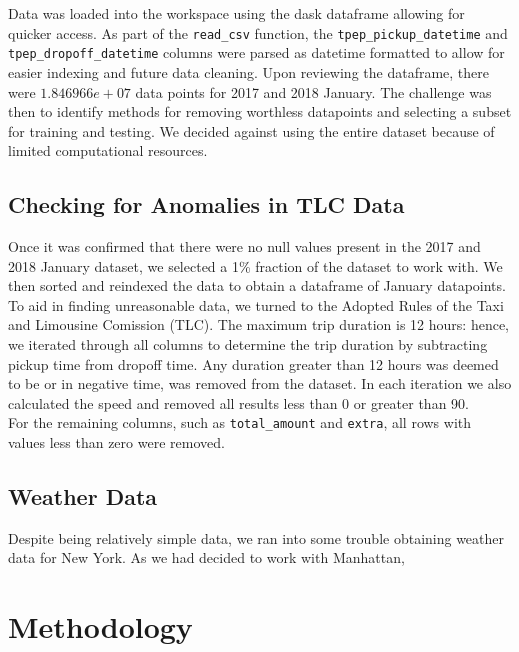 \documentclass[journal]{IEEEtran}
\newcommand{\cc}[1]{\texttt{#1}}
\begin{document}
\noindent Data was loaded into the workspace using the dask dataframe allowing for quicker access. As part of the \cc{read\_csv} function, the  \cc{tpep\_pickup\_datetime} and \cc{tpep\_dropoff\_datetime} columns were parsed as datetime formatted to allow for easier indexing and future data cleaning. Upon reviewing the dataframe, there were $1.846966e+07$ data points for 2017 and 2018 January. The challenge was then to identify methods for removing worthless datapoints and selecting a subset for training and testing. We decided against using the entire dataset because of limited computational resources. 

\subsection{Checking for Anomalies in TLC Data}

\noindent Once it was confirmed that there were no null values present in the 2017 and 2018 January dataset, we selected a {\color{red} 1\% fraction} of the dataset to work with. We then sorted and reindexed the data to obtain a dataframe of January datapoints.\\

\noindent To aid in finding unreasonable data, we turned to the Adopted Rules of the Taxi and Limousine Comission (TLC). The maximum trip duration is 12 hours: hence, we iterated through all columns to determine the trip duration by subtracting pickup time from dropoff time. Any duration greater than 12 hours was deemed to be {\color{blue} or in negative time}, was removed from the dataset. In each iteration we also calculated the speed and removed all results less than 0 or greater than 90.\\

\noindent For the remaining columns, such as \cc{total\_amount} and \cc{extra}, all rows with values less than zero were removed. 

\subsection{Weather Data}
\noindent Despite being relatively simple data, we ran into some trouble obtaining weather data for New York. As we had decided to work with Manhattan,  


\section{Methodology}
\end{document}
